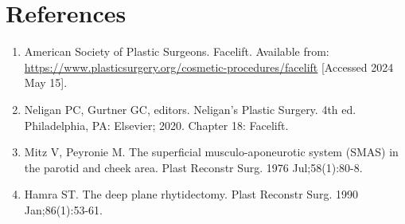 \section*{References}
\begin{enumerate}
  \item American Society of Plastic Surgeons. Facelift. Available from: \url{https://www.plasticsurgery.org/cosmetic-procedures/facelift} [Accessed 2024 May 15].
  \item Neligan PC, Gurtner GC, editors. Neligan's Plastic Surgery. 4th ed. Philadelphia, PA: Elsevier; 2020. Chapter 18: Facelift.
  \item Mitz V, Peyronie M. The superficial musculo-aponeurotic system (SMAS) in the parotid and cheek area. Plast Reconstr Surg. 1976 Jul;58(1):80-8.
  \item Hamra ST. The deep plane rhytidectomy. Plast Reconstr Surg. 1990 Jan;86(1):53-61.
\end{enumerate}

\clearpage
